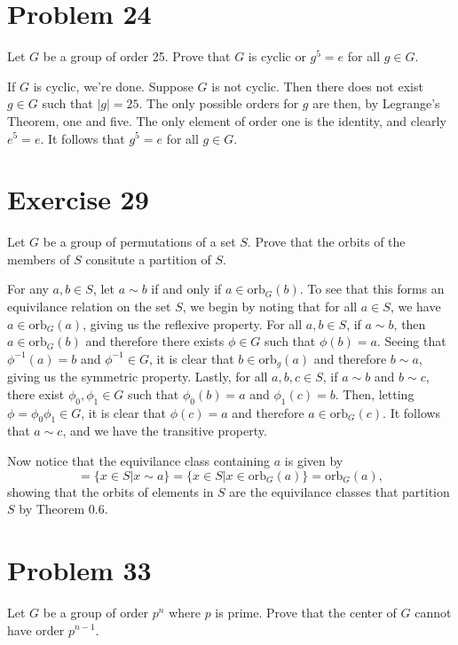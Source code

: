 \documentclass[12pt]{article}
\newcommand{\orb}{\mbox{orb}}
\begin{document}
\section*{Problem 24}

Let $G$ be a group of order 25.  Prove that $G$ is cyclic or $g^5=e$ for all $g\in G$.

If $G$ is cyclic, we're done.  Suppose $G$ is not cyclic.  Then there does not
exist $g\in G$ such that $|g|=25$.  The only possible orders for $g$ are
then, by Legrange's Theorem, one and five.  The only element of order one
is the identity, and clearly $e^5=e$.  It follows that $g^5=e$ for all $g\in G$.

\section*{Exercise 29}

Let $G$ be a group of permutations of a set $S$.  Prove that the orbits of the
members of $S$ consitute a partition of $S$.

For any $a,b\in S$, let $a\sim b$ if and only if $a\in\orb_G(b)$.
To see that this forms an equivilance relation on the set $S$,
we begin by noting that for all $a\in S$, we have $a\in\orb_G(a)$,
giving us the reflexive property.  For all $a,b\in S$, if $a\sim b$,
then $a\in\orb_G(b)$ and therefore there exists $\phi\in G$ such
that $\phi(b)=a$.  Seeing that $\phi^{-1}(a)=b$ and $\phi^{-1}\in G$, it is clear
that $b\in\orb_g(a)$ and therefore $b\sim a$, giving us the symmetric property.
Lastly, for all $a,b,c\in S$, if $a\sim b$ and $b\sim c$, there exist $\phi_0,\phi_1\in G$
such that $\phi_0(b)=a$ and $\phi_1(c)=b$.  Then, letting $\phi=\phi_0\phi_1\in G$,
it is clear that $\phi(c)=a$ and therefore $a\in\orb_G(c)$.  It follows that $a\sim c$,
and we have the transitive property.

Now notice that the equivilance class containing $a$ is given by
\begin{equation*}
[a]=\{x\in S|x\sim a\}=\{x\in S|x\in\orb_G(a)\}=\orb_G(a),
\end{equation*}
showing that the orbits of elements in $S$ are the equivilance classes
that partition $S$ by Theorem 0.6.

\section*{Problem 33}

Let $G$ be a group of order $p^n$ where $p$ is prime.  Prove that the center of
$G$ cannot have order $p^{n-1}$.
\end{document}
